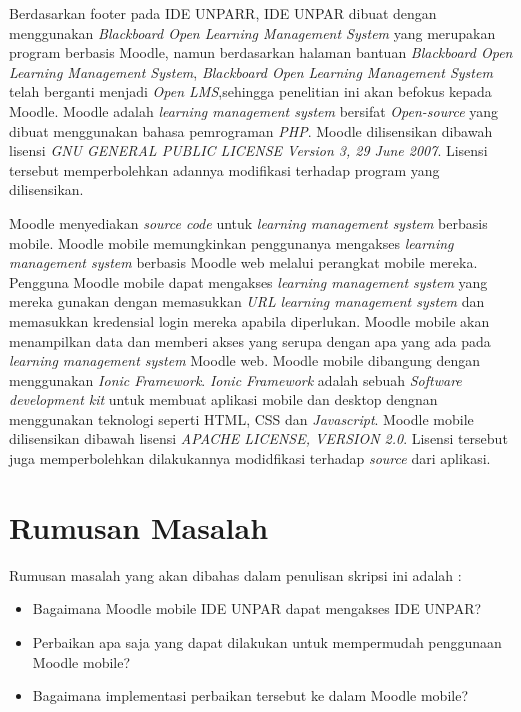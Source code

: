 \documentclass[a4paper,twoside]{article}
\begin{document}
Berdasarkan footer pada IDE UNPARR, IDE UNPAR dibuat dengan menggunakan \textit{Blackboard Open Learning Management System}\cite{IDEUNPAR} yang merupakan program berbasis Moodle, namun berdasarkan halaman bantuan \textit{Blackboard Open Learning Management System}, \textit{Blackboard Open Learning Management System} telah berganti menjadi \textit{Open LMS}\cite{Blackboard},sehingga penelitian ini akan befokus kepada Moodle. Moodle adalah \textit{learning management system} bersifat \textit{Open-source} yang dibuat menggunakan bahasa pemrograman \textit{PHP}. Moodle dilisensikan dibawah lisensi \textit{GNU GENERAL PUBLIC LICENSE Version 3, 29 June 2007}. Lisensi tersebut memperbolehkan adannya modifikasi terhadap program yang dilisensikan.

Moodle menyediakan \textit{source code} untuk \textit{learning management system} berbasis mobile. Moodle mobile memungkinkan penggunanya mengakses \textit{learning management system} berbasis Moodle web melalui perangkat mobile mereka. Pengguna Moodle mobile dapat mengakses \textit{learning management system} yang mereka gunakan dengan memasukkan \textit{URL} \textit{learning management system} dan memasukkan kredensial login mereka apabila diperlukan. Moodle mobile akan menampilkan data dan memberi akses yang serupa dengan apa yang ada pada \textit{learning management system} Moodle web. Moodle mobile dibangung dengan menggunakan \textit{Ionic Framework}. \textit{Ionic Framework} adalah sebuah \textit{Software development kit} untuk membuat aplikasi mobile dan desktop dengnan menggunakan teknologi seperti HTML, CSS dan \textit{Javascript}\cite{Ionic:intro}. Moodle mobile dilisensikan dibawah lisensi   \textit{APACHE LICENSE, VERSION 2.0}. Lisensi tersebut juga memperbolehkan dilakukannya modidfikasi terhadap \textit{source} dari aplikasi.
\section{Rumusan Masalah}
Rumusan masalah yang akan dibahas dalam penulisan skripsi ini adalah :
\begin{itemize}
	\item Bagaimana Moodle mobile IDE UNPAR dapat mengakses IDE UNPAR?
	\item Perbaikan apa saja yang dapat dilakukan untuk mempermudah penggunaan Moodle mobile?
	\item Bagaimana implementasi perbaikan tersebut ke dalam Moodle mobile?
\end{itemize}
\end{document}
